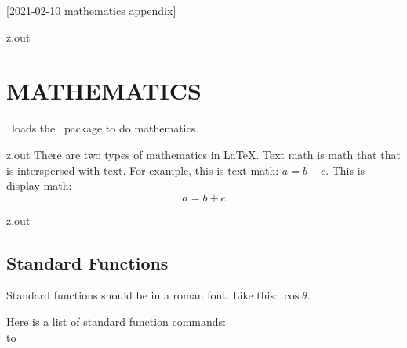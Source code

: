 [2021-02-10 mathematics appendix]

\begin{VerbatimOut}{z.out}
\chapter{MATHEMATICS}

\PurdueThesis\ loads the \amsmath\ package \cite{amslatex3project2019}
to do mathematics.
\end{VerbatimOut}

\MyIO


\begin{VerbatimOut}{z.out}
There are two types of mathematics in \LaTeX.
Text math is math that that is interspersed with text.
For example, this is text math: \(a = b + c\).
This is display math:
\begin{equation}
  a = b + c
\end{equation}
\end{VerbatimOut}

\MyIO


\begin{VerbatimOut}{z.out}
\newpage

\section{Standard Functions}

Standard functions should be in a roman font.
Like this: \(\cos\theta\).

Here is a list of standard function commands:\\

\hbox to
\end{VerbatimOut}

